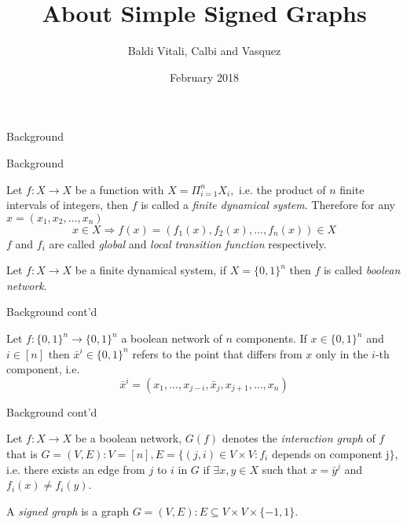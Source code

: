 \documentclass{beamer}
\title{About Simple Signed Graphs}
\author{Baldi Vitali, Calbi and Vasquez}
\institute{Université de Nice Sophia-Antipolis}
\date{February 2018}
\begin{document}
	
\frame{\titlepage}

\begin{section}{Background}

\begin{frame}{Background}
    \begin{definition}
        Let $f:X \to X$ be a function with $X=\Pi_{i=1}^n X_i,$ i.e. the product of $n$ finite intervals of integers, then $f$ is called a \textit{finite dynamical system}. Therefore for any $x = (x_1, x_2, \dots, x_n)$
        \[
        x \in X \Rightarrow f(x) = (f_1(x), f_2(x), \dots, f_n(x)) \in X
        \]
        $f$ and $f_i$ are called \textit{global} and \textit{local transition function} respectively.
    \end{definition}
    
    \begin{definition}
        Let $f:X \to X$ be a finite dynamical system, if $X=\{0,1\}^n$ then $f$ is called \textit{boolean network}.
    \end{definition}
\end{frame}

\begin{frame}{Background cont'd}
    \begin{definition}[$\bar{x}^i$]
    	Let $f:\{0,1\}^n \rightarrow \{0,1\}^n$ a boolean network of $n$ components. If $x \in \{0,1\}^n$ and $i \in [n]$ then $\bar{x}^i \in \{0,1\}^n$ refers to the point that differs from $x$ only in the $i$-th component, i.e.
    	\[
    	\bar{x}^i = (x_1, \dots, x_{j-i}, \bar{x}_j, x_{j+1}, \dots, x_n)
    	\]
    \end{definition}
\end{frame}

\begin{frame}{Background cont'd}
    \begin{definition}
        Let $f : X \to X$ be a boolean network, $G(f)$ denotes the \textit{interaction graph} of $f$ that is $G=(V,E) : V = [n], E = \{ (j,i) \in V \times V : f_i$ depends on component j$\}$, i.e. there exists an edge from $j$ to $i$ in $G$ if $\exists x,y \in X$ such that $x = \bar{y}^j$ and $f_i(x) \neq f_i(y)$.
    \end{definition}
    
    \begin{definition}
        A \textit{signed graph} is a graph $G=(V,E) : E \subseteq V \times V \times \{-1,1\}.$
    \end{definition}


\end{frame}
\end{section}
\end{document}
